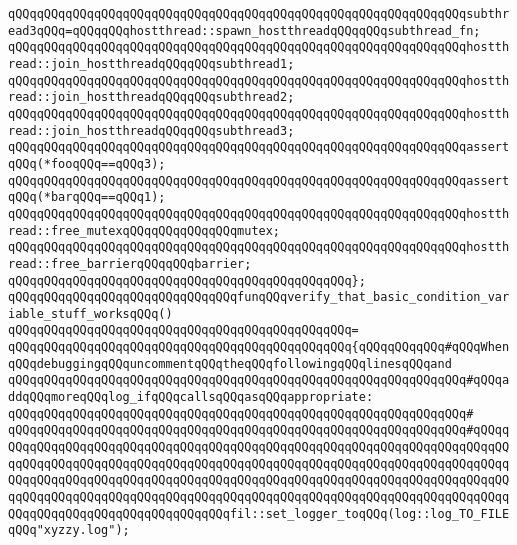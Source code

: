 \verb|qQQqqQQqqQQqqQQqqQQqqQQqqQQqqQQqqQQqqQQqqQQqqQQqqQQqqQQqqQQqqQQqsubthread3qQQq=qQQqqQQqhostthread::spawn_hostthreadqQQqqQQqsubthread_fn;|\newline
\newline
\newline
\verb|qQQqqQQqqQQqqQQqqQQqqQQqqQQqqQQqqQQqqQQqqQQqqQQqqQQqqQQqqQQqqQQqhostthread::join_hostthreadqQQqqQQqsubthread1;|\newline
\verb|qQQqqQQqqQQqqQQqqQQqqQQqqQQqqQQqqQQqqQQqqQQqqQQqqQQqqQQqqQQqqQQqhostthread::join_hostthreadqQQqqQQqsubthread2;|\newline
\verb|qQQqqQQqqQQqqQQqqQQqqQQqqQQqqQQqqQQqqQQqqQQqqQQqqQQqqQQqqQQqqQQqhostthread::join_hostthreadqQQqqQQqsubthread3;|\newline
\newline
\verb|qQQqqQQqqQQqqQQqqQQqqQQqqQQqqQQqqQQqqQQqqQQqqQQqqQQqqQQqqQQqqQQqassertqQQq(*fooqQQq==qQQq3);|\newline
\verb|qQQqqQQqqQQqqQQqqQQqqQQqqQQqqQQqqQQqqQQqqQQqqQQqqQQqqQQqqQQqqQQqassertqQQq(*barqQQq==qQQq1);|\newline
\newline
\verb|qQQqqQQqqQQqqQQqqQQqqQQqqQQqqQQqqQQqqQQqqQQqqQQqqQQqqQQqqQQqqQQqhostthread::free_mutexqQQqqQQqqQQqqQQqmutex;|\newline
\verb|qQQqqQQqqQQqqQQqqQQqqQQqqQQqqQQqqQQqqQQqqQQqqQQqqQQqqQQqqQQqqQQqhostthread::free_barrierqQQqqQQqbarrier;|\newline
\verb|qQQqqQQqqQQqqQQqqQQqqQQqqQQqqQQqqQQqqQQqqQQqqQQq};|\newline
\newline
\verb|qQQqqQQqqQQqqQQqqQQqqQQqqQQqqQQqfunqQQqverify_that_basic_condition_variable_stuff_worksqQQq()|\newline
\verb|qQQqqQQqqQQqqQQqqQQqqQQqqQQqqQQqqQQqqQQqqQQqqQQq=|\newline
\verb|qQQqqQQqqQQqqQQqqQQqqQQqqQQqqQQqqQQqqQQqqQQqqQQq{qQQqqQQqqQQq#qQQqWhenqQQqdebuggingqQQquncommentqQQqtheqQQqfollowingqQQqlinesqQQqand|\newline
\verb|qQQqqQQqqQQqqQQqqQQqqQQqqQQqqQQqqQQqqQQqqQQqqQQqqQQqqQQqqQQqqQQq#qQQqaddqQQqmoreqQQqlog_ifqQQqcallsqQQqasqQQqappropriate:|\newline
\verb|qQQqqQQqqQQqqQQqqQQqqQQqqQQqqQQqqQQqqQQqqQQqqQQqqQQqqQQqqQQqqQQq#|\newline
\verb|qQQqqQQqqQQqqQQqqQQqqQQqqQQqqQQqqQQqqQQqqQQqqQQqqQQqqQQqqQQqqQQq#qQQqqQQqqQQqqQQqqQQqqQQqqQQqqQQqqQQqqQQqqQQqqQQqqQQqqQQqqQQqqQQqqQQqqQQqqQQqqQQqqQQqqQQqqQQqqQQqqQQqqQQqqQQqqQQqqQQqqQQqqQQqqQQqqQQqqQQqqQQqqQQqqQQqqQQqqQQqqQQqqQQqqQQqqQQqqQQqqQQqqQQqqQQqqQQqqQQqqQQqqQQqqQQqqQQqqQQqqQQqqQQqqQQqqQQqqQQqqQQqqQQqqQQqqQQqqQQqqQQqqQQqqQQqqQQqqQQqqQQqqQQqqQQqqQQqqQQqqQQqqQQqqQQqqQQqqQQqfil::set_logger_toqQQq(log::log_TO_FILEqQQq"xyzzy.log");|\newline
